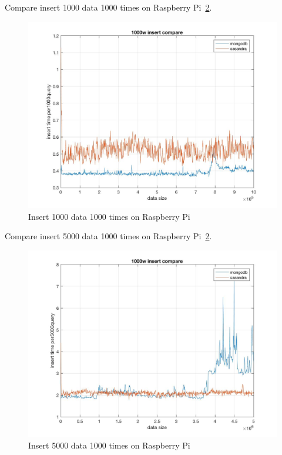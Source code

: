 Compare insert 1000 data 1000 times on Raspberry Pi~\ref{f:fly}.

\begin{figure}[!ht]
  \centering\includegraphics[width=\columnwidth]
  {images/insert_comp_1000_pi.jpg}
  \caption{Insert 1000 data 1000 times on Raspberry Pi }\label{f:fly}
\end{figure}

Compare insert 5000 data 1000 times on Raspberry Pi~\ref{f:fly}.

\begin{figure}[!ht]
  \centering\includegraphics[width=\columnwidth]
  {images/insert_comp_5000_pi.jpg}
  \caption{Insert 5000 data 1000 times on Raspberry Pi}\label{f:fly}
\end{figure}

